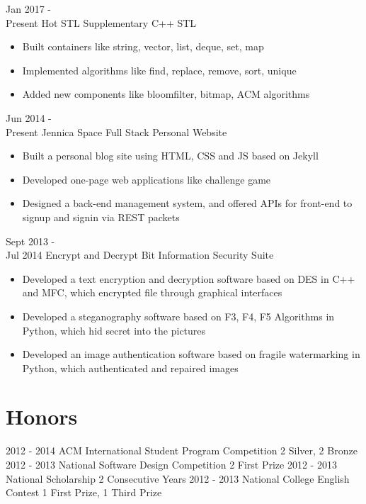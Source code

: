 \documentclass[letterpaper]{twentysecondcv} %
\begin{document}
\begin{twenty} %
	\twentyitem
	{Jan 2017 - \\Present}
	{Hot STL}
	{Supplementary C++ STL}
	{}
	{
		{\begin{itemize}
				\item Built containers like string, vector, list, deque, set, map
				\item Implemented algorithms like find, replace, remove, sort, unique
				\item Added new components like bloomfilter, bitmap, ACM algorithms
		\end{itemize}}
	}

	\twentyitem
	{Jun 2014 - \\Present}
	{Jennica Space}
	{Full Stack Personal Website}
	{}
	{
		{\begin{itemize}
				\item Built a personal blog site using HTML, CSS and JS based on Jekyll
				\item Developed one-page web applications like challenge game
				\item Designed a back-end management system, and offered APIs for front-end to signup and signin via REST packets
		\end{itemize}}
	}

	\twentyitem
	{Sept 2013 - \\Jul 2014}
	{Encrypt and Decrypt Bit}
	{Information Security Suite}
	{}
	{
		{\begin{itemize}
				\item Developed a text encryption and decryption software based on DES in C++ and MFC, which encrypted file through graphical interfaces
				\item Developed a steganography software based on F3, F4, F5 Algorithms in Python, which hid secret into the pictures
				\item Developed an image authentication software based on fragile watermarking in Python, which authenticated and repaired images
		\end{itemize}}
	}
	
\end{twenty}



\section{Honors}
\begin{twenty}
	\twentyitemthree
	{2012 - 2014}
	{ACM International Student Program Competition}
	{2 Silver, 2 Bronze}
	\twentyitemthree
	{2012 - 2013}
	{National Software Design Competition}
	{2 First Prize}
	\twentyitemthree
	{2012 - 2013}
	{National Scholarship}
	{2 Consecutive Years}
	\twentyitemthree
	{2012 - 2013}
	{National College English Contest}
	{1 First Prize, 1 Third Prize}
\end{twenty}
\end{document}
